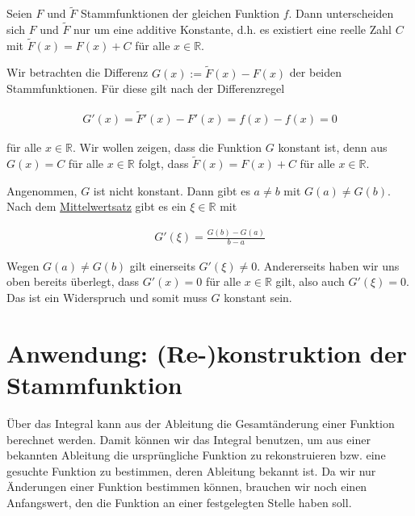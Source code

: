 \documentclass[fontsize=9pt,
               parskip=half-,
               DIV=14,
               listof=chapterentry,
               tocflat]{scrbook}
\begin{document}
\begin{theorem*}
Seien $F$ und ${\tilde {F}}$ Stammfunktionen der gleichen Funktion $f$. Dann unterscheiden sich $F$ und ${\tilde {F}}$ nur um eine additive Konstante, d.h. es existiert eine reelle Zahl $C$ mit ${\tilde {F}}(x)=F(x)+C$ für alle $x\in \mathbb {R} $.

\end{theorem*}

\begin{proof*}
Wir betrachten die Differenz $G(x):={\tilde {F}}(x)-F(x)$ der beiden Stammfunktionen. Für diese gilt nach der Differenzregel

\begin{align*}
G'(x)={\tilde {F}}'(x)-F'(x)=f(x)-f(x)=0
\end{align*}

für alle $x\in \mathbb {R} $. Wir wollen zeigen, dass die Funktion $G$ konstant ist, denn aus $G(x)=C$ für alle $x\in \mathbb {R} $ folgt, dass ${\tilde {F}}(x)=F(x)+C$ für alle $x\in \mathbb {R} $.

Angenommen, $G$ ist nicht konstant. Dann gibt es $a\neq b$ mit $G(a)\neq G(b)$. Nach dem \href{https://de.wikibooks.org/wiki/Mathe\_für\_Nicht-Freaks:\_Mittelwertsatz}
{Mittelwertsatz} gibt es ein $\xi \in \mathbb {R} $ mit

\begin{align*}
G'(\xi )={\frac {G(b)-G(a)}{b-a}}
\end{align*}

Wegen $G(a)\neq G(b)$ gilt einerseits $G'(\xi )\neq 0$. Andererseits haben wir uns oben bereits überlegt, dass $G'(x)=0$ für alle $x\in \mathbb {R} $ gilt, also auch $G'(\xi )=0$. Das ist ein Widerspruch und somit muss $G$ konstant sein.

\end{proof*}

\section{Anwendung: (Re-)konstruktion der Stammfunktion}

Über das Integral kann aus der Ableitung die Gesamtänderung einer Funktion berechnet werden. Damit können wir das Integral benutzen, um aus einer bekannten Ableitung die ursprüngliche Funktion zu rekonstruieren bzw. eine gesuchte Funktion zu bestimmen, deren Ableitung bekannt ist. Da wir nur Änderungen einer Funktion bestimmen können, brauchen wir noch einen Anfangswert, den die Funktion an einer festgelegten Stelle haben soll.
\end{document}
